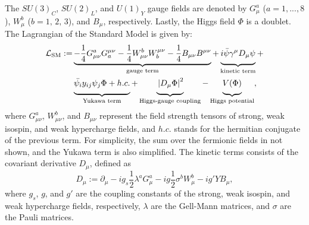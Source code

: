 The $SU(3)_C$, $SU(2)_L$, and $U(1)_Y$ gauge fields are denoted by $G_\mu^a$ ($a=1,...,8$), $W_\mu^b$ ($b=1,\,2,\,3$), and $B_\mu$, respectively. Lastly, the Higgs field $\Phi$ is a doublet. The Lagrangian of the Standard Model is given by:
\begin{equation}
\begin{split}    
    \mathcal{L}_{\mathrm{SM}}:= &
    \underbrace{-\frac{1}{4}G_{\mu\nu}^a G^{\mu\nu}_a-\frac{1}{4}W_{\mu\nu}^b W^{\mu\nu}_b-\frac{1}{4}B_{\mu\nu}B^{\mu\nu}}_\text{gauge term}+
    \underbrace{\vphantom{\frac{.}{.}}i \bar{\psi} \gamma^\mu D_\mu \psi}_\text{kinetic term}+ \\
    & \underbrace{\vphantom{\frac{.}{.}}\bar{\psi_i} y_{i j} \psi_j \Phi+h.c.}_\text{Yukawa term}+
    \underbrace{\vphantom{\frac{.}{.}}\left|D_\mu \Phi\right|^2}_\text{Higgs-gauge coupling}-
    \underbrace{\vphantom{\frac{.}{.}}V(\Phi)}_\text{Higgs potential}
    ,
\end{split}
\end{equation}
where $G_{\mu\nu}^a$, $W_{\mu\nu}^b$, and $B_{\mu\nu}$ represent the field strength tensors of strong, weak isospin, and weak hypercharge fields, and $h.c.$ stands for the hermitian conjugate of the previous term. For simplicity, the sum over the fermionic fields in not shown, and the Yukawa term is also simplified. The kinetic terms consists of the covariant derivative $D_\mu$, defined as
\begin{equation}
    D_\mu := \partial_\mu - i g_s \frac{1}{2}\lambda^a G_\mu^a -i g \frac{1}{2} \sigma^b W_\mu^b -i g' Y B_\mu, 
\end{equation}
where $g_s$, $g$, and $g'$ are the coupling constants of the strong, weak isospin, and weak hypercharge fields, respectively, $\lambda$ are the Gell-Mann matrices, and $\sigma$ are the Pauli matrices.

